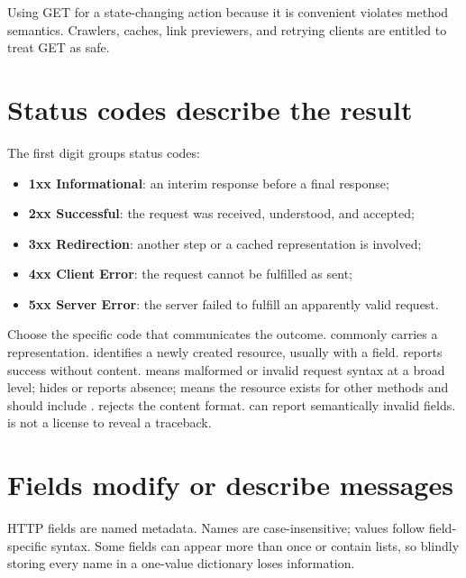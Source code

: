 \begin{pitfall}
Using GET for a state-changing action because it is convenient violates method
semantics. Crawlers, caches, link previewers, and retrying clients are entitled
to treat GET as safe.
\end{pitfall}

\section{Status codes describe the result}

The first digit groups status codes:

\begin{itemize}
  \item \textbf{1xx Informational}: an interim response before a final response;
  \item \textbf{2xx Successful}: the request was received, understood, and accepted;
  \item \textbf{3xx Redirection}: another step or a cached representation is involved;
  \item \textbf{4xx Client Error}: the request cannot be fulfilled as sent;
  \item \textbf{5xx Server Error}: the server failed to fulfill an apparently valid request.
\end{itemize}

Choose the specific code that communicates the outcome.  commonly
carries a representation.  identifies a newly created
resource, usually with a  field.  reports
success without content.  means malformed or invalid
request syntax at a broad level;  hides or reports absence;
 means the resource exists for other methods and
should include .  rejects the
content format.  can report semantically invalid
fields.  is not a license to reveal a traceback.

\section{Fields modify or describe messages}

HTTP fields are named metadata. Names are case-insensitive; values follow
field-specific syntax. Some fields can appear more than once or contain lists,
so blindly storing every name in a one-value dictionary loses information.

